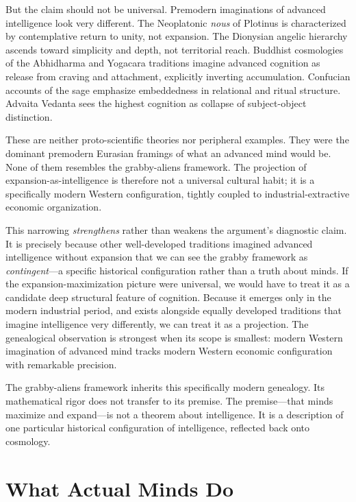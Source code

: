 \documentclass[11pt,a4paper,twocolumn]{article}
\begin{document}
But the claim should not be universal. Premodern imaginations of
advanced intelligence look very different. The Neoplatonic \emph{nous}
of Plotinus is characterized by contemplative return to unity, not
expansion. The Dionysian angelic hierarchy ascends toward simplicity
and depth, not territorial reach. Buddhist cosmologies of the
Abhidharma and Yogacara traditions imagine advanced cognition as
release from craving and attachment, explicitly inverting
accumulation. Confucian accounts of the sage emphasize embeddedness
in relational and ritual structure. Advaita Vedanta sees the highest
cognition as collapse of subject-object distinction.

These are neither proto-scientific theories nor peripheral examples.
They were the dominant premodern Eurasian framings of what an
advanced mind would be. None of them resembles the grabby-aliens
framework. The projection of expansion-as-intelligence is therefore
not a universal cultural habit; it is a specifically modern Western
configuration, tightly coupled to industrial-extractive economic
organization.

This narrowing \emph{strengthens} rather than weakens the argument's
diagnostic claim. It is precisely because other well-developed
traditions imagined advanced intelligence without expansion that we
can see the grabby framework as \emph{contingent}---a specific
historical configuration rather than a truth about minds. If the
expansion-maximization picture were universal, we would have to treat
it as a candidate deep structural feature of cognition. Because it
emerges only in the modern industrial period, and exists alongside
equally developed traditions that imagine intelligence very
differently, we can treat it as a projection. The genealogical
observation is strongest when its scope is smallest: modern Western
imagination of advanced mind tracks modern Western economic
configuration with remarkable precision.

The grabby-aliens framework inherits this specifically modern
genealogy. Its mathematical rigor does not transfer to its premise.
The premise---that minds maximize and expand---is not a theorem about
intelligence. It is a description of one particular historical
configuration of intelligence, reflected back onto cosmology.


\section{What Actual Minds Do}
\label{sec:minds}
\end{document}
